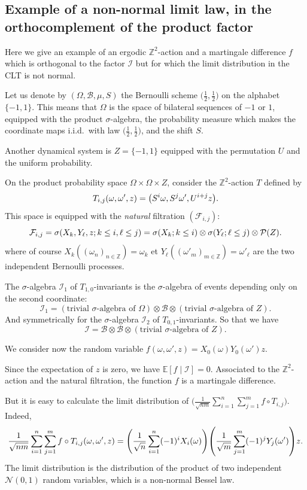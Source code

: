 \documentclass[10pt]{amsart}
\theoremstyle{definition}\newtheorem{defi}[theo]{Definition}\newtheorem{rema}[theo]{Remark}\newtheorem{exam}[theo]{Example}\newtheorem{exem}[theo]{Example}\newtheorem{nota}[theo]{Notation}
\newcommand{\Z}{\mathbb{Z}}
\newcommand{\bbE}{\mathbb{E}}
\newcommand*\I{\mathcal{I}}
\newcommand*\B{\mathcal{B}}
\newcommand*\F{\mathcal{F}}
\renewcommand*\P{\mathcal{P}}
\newcommand*\clN{\mathcal{N}}
\let\originalleft\left
\let\originalright\right
\renewcommand{\left}{\mathopen{}\mathclose\bgroup\originalleft}
\renewcommand{\right}{\aftergroup\egroup\originalright}
\begin{document}
\subsection{Example of a non-normal limit law, in the orthocomplement of the product factor}\label{nnormal_ex}
Here we give an example of an ergodic $\Z^2$-action and a martingale difference $f$ which is orthogonal to the factor $\I$ but for which the limit distribution in the CLT is not normal.

Let us denote by $(\Omega,\B,\mu,S)$ the Bernoulli scheme $\bigl(\frac12,\frac12\bigr)$ on the alphabet $\{-1,1\}$. This means that $\Omega$ is the space of bilateral sequences of $-1$ or $1$, equipped with the product $\sigma$-algebra, the probability measure which makes the coordinate maps i.i.d.\ with law $\bigl(\frac12,\frac12\bigr)$, and the shift $S$.

Another dynamical system is $Z=\{-1,1\}$ equipped with the permutation $U$ and the uniform probability.

On the product probability space $\Omega\times\Omega\times Z$, consider the $\Z^2$-action $T$ defined by
\[
T_{i,j}(\omega,\omega',z)=\left(S^i\omega,S^j\omega',U^{i+j}z\right).
\]
This space is equipped with the \emph{natural} filtration $(\F_{i,j})$:
\[
\F_{i,j}=\sigma\left(X_k,Y_\ell,z ; k\leq i, \ell\leq j\right)=\sigma\left(X_k ; k\leq i\right)\otimes\sigma\left(Y_\ell ; \ell\leq j\right)\otimes\P(Z).
\]
where of course $X_k((\omega_n)_{n\in\Z})=\omega_k$ et $Y_\ell((\omega'_m)_{m\in\Z})=\omega'_\ell$ are the two independent Bernoulli processes.

The $\sigma$-algebra $\I_1$ of $T_{1,0}$-invariants is the $\sigma$-algebra of events depending only on the second coordinate:
\[
\I_1= (\text{trivial $\sigma$-algebra of $\Omega$})\otimes\B\otimes(\text{trivial $\sigma$-algebra of $Z$}).
\]
And symmetrically for the $\sigma$-algebra $\I_2$ of $T_{0,1}$-invariants. So that we have
\[
\I=\B\otimes\B\otimes(\text{trivial $\sigma$-algebra of $Z$}).
\]

We consider now the random variable $f(\omega,\omega',z)=X_0(\omega)Y_0(\omega')z$.

Since the expectation of $z$ is zero, we have $\bbE[f\mid\I]=0$. Associated to the $\Z^2$-action and the natural filtration, the function $f$ is a martingale difference.

But it is easy to calculate the limit distribution of $\bigl(\frac1{\sqrt{nm}}\sum_{i=1}^n\sum_{j=1}^m f\circ{T_{i,j}}\bigr)$. Indeed,
\[
\frac1{\sqrt{nm}}\sum_{i=1}^n\sum_{j=1}^m f\circ{T_{i,j}}(\omega,\omega',z)=\left(\frac1{\sqrt{n}}\sum_{i=1}^n(-1)^iX_i(\omega)\right)\left(\frac1{\sqrt{m}}\sum_{j=1}^m(-1)^jY_j(\omega')\right)z.
\]
The limit distribution is the distribution of the product of two independent $\clN(0,1)$ random variables, which is a non-normal Bessel law.
\end{document}
